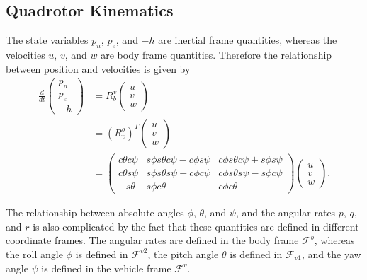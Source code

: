 {%
\subsection{Quadrotor Kinematics} %
\label{sec:kin-kinematics}

The state variables $p_n$, $p_e$, and $-h$ are inertial frame
quantities, whereas the velocities $u$, $v$, and $w$ are body frame
quantities. Therefore the relationship between position and
velocities is given by
\begin{align*}
\frac{d}{dt} \begin{pmatrix} p_n \\ p_e \\ -h \end{pmatrix} &=
R_{b}^{v} \begin{pmatrix} u \\ v \\ w \end{pmatrix} \\
&= (R_{v}^{b})^T \begin{pmatrix} u \\ v \\ w \end{pmatrix} \\
&= \begin{pmatrix} c\theta c\psi & s\phi s\theta c\psi - c\phi s\psi
& c\phi s\theta
c\psi + s\phi s\psi \\
c\theta s\psi &  s\phi s\theta s\psi + c\phi c\psi
  & c\phi s\theta s\psi - s\phi c\psi  \\
-s\theta & s\phi c\theta & c\phi c\theta
\end{pmatrix}
\begin{pmatrix} u \\ v \\ w \end{pmatrix}.
\end{align*}


The relationship between absolute angles $\phi$, $\theta$, and
$\psi$, and the angular rates $p$, $q$, and $r$ is also complicated
by the fact that these quantities are defined in different
coordinate frames.  The angular rates are defined in the body frame
$\mathcal{F}^b$, whereas the roll angle $\phi$ is defined in
$\mathcal{F}^{v2}$, the pitch angle $\theta$ is defined in
$\mathcal{F}_{v1}$, and the yaw angle $\psi$ is defined in the
vehicle frame $\mathcal{F}^{v}$.

}
